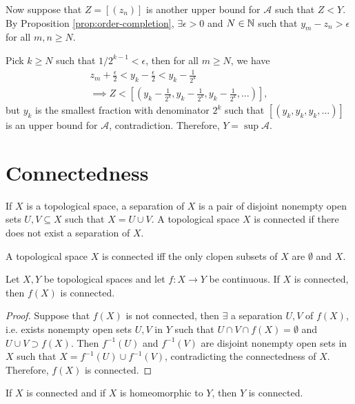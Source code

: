 Now suppose that $Z = [(z_n)]$ is another upper bound for $\mathcal A$ such that $Z < Y$. By Proposition \ref{prop:order-completion}, $\exists \epsilon > 0$ and $N\in {\mathbb N}$ such that $y_m - z_n > \epsilon$ for all $m, n\geq N$. 

Pick $k\geq N$ such that $1/2^{k-1} < \epsilon$, then for all $m\geq N$, we have
\begin{gather*}
    z_m + \frac\epsilon2 < y_k - \frac\epsilon2 < y_k - \frac1{2^k} \\
    \implies Z < [(y_k - \frac1{2^k}, y_k - \frac1{2^k}, y_k - \frac1{2^k}, \ldots)],
\end{gather*}
but $y_k$ is the smallest fraction with denominator $2^k$ such that $[(y_k, y_k, y_k, \ldots)]$ is an upper bound for $\mathcal A$, contradiction. Therefore, $Y = \sup \mathcal A$.

\section{Connectedness}

\begin{df}
    If $X$ is a topological space, a separation of $X$ is a pair of disjoint nonempty open sets $U, V \subseteq X$ such that $X = U \cup V$. A topological space $X$ is connected if there does not exist a separation of $X$.
\end{df}

\begin{prop}
    A topological space $X$ is connected iff the only clopen subsets of $X$ are $\emptyset$ and $X$.
\end{prop}

\begin{prop}
    Let $X, Y$ be topological spaces and let $f: X \to Y$ be continuous. If $X$ is connected, then $f(X)$ is connected.
    \begin{proof}
        Suppose that $f(X)$ is not connected, then $\exists$ a separation $U, V$ of $f(X)$, i.e. exists nonempty open sets $U, V$ in $Y$ such that $U\cap V\cap f(X) = \emptyset$ and $U\cup V \supset f(X)$. Then $f^{-1}(U)$ and $f^{-1}(V)$ are disjoint nonempty open sets in $X$ such that $X = f^{-1}(U) \cup f^{-1}(V)$, contradicting the connectedness of $X$. Therefore, $f(X)$ is connected.
    \end{proof}
\end{prop}

\begin{cl}
    If $X$ is connected and if $X$ is homeomorphic to $Y$, then $Y$ is connected.
\end{cl}

